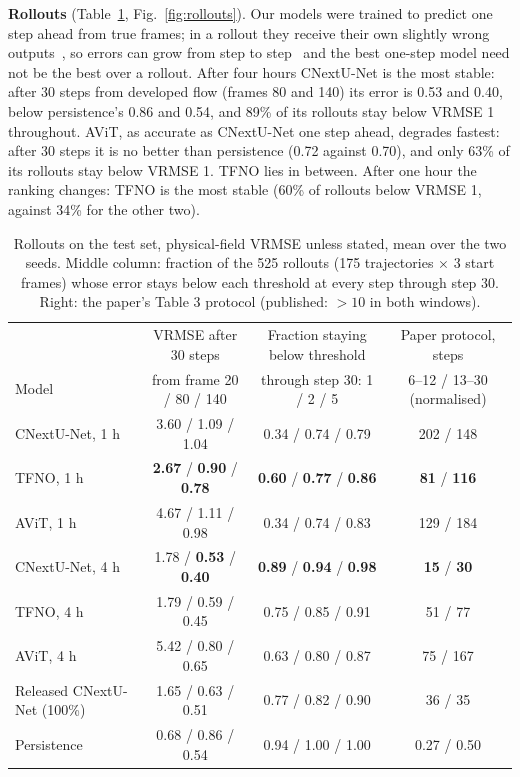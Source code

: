 \documentclass[11pt]{article}
\begin{document}
\newpage
\textbf{Rollouts} (Table~\ref{tab:rollout}, Fig.~\ref{fig:rollouts}). Our models were trained to predict one step
ahead from true frames; in a rollout they receive their own slightly wrong outputs~\cite{brandstetter2022mp}, so
errors can grow from step to step~\cite{mccabe2023stability} and the best one-step model need not be the best over a
rollout. After four hours CNextU-Net is the most stable: after 30 steps from developed flow (frames 80 and 140) its
error is 0.53 and 0.40, below persistence's 0.86 and 0.54, and 89\% of its rollouts stay below VRMSE 1 throughout.
AViT, as accurate as CNextU-Net one step ahead, degrades fastest: after 30 steps it is no better than persistence
(0.72 against 0.70), and only 63\% of its rollouts stay below VRMSE 1. TFNO lies in between. After one hour the
ranking changes: TFNO is the most stable (60\% of rollouts below VRMSE 1, against 34\% for the other two).


\begin{table}[!htbp]
\centering\footnotesize
\begin{tabular}{@{}lccc@{}}
\toprule
& VRMSE after 30 steps & Fraction staying below threshold & Paper protocol, steps \\
Model & from frame 20 / 80 / 140 & through step 30: 1 / 2 / 5 & 6--12 / 13--30 (normalised) \\
\midrule
CNextU-Net, 1 h & 3.60 / 1.09 / 1.04 & 0.34 / 0.74 / 0.79 & 202 / 148 \\
TFNO, 1 h & \textbf{2.67} / \textbf{0.90} / \textbf{0.78} & \textbf{0.60} / \textbf{0.77} / \textbf{0.86} & \textbf{81} / \textbf{116} \\
AViT, 1 h & 4.67 / 1.11 / 0.98 & 0.34 / 0.74 / 0.83 & 129 / 184 \\
\midrule
CNextU-Net, 4 h & 1.78 / \textbf{0.53} / \textbf{0.40} & \textbf{0.89} / \textbf{0.94} / \textbf{0.98} & \textbf{15} / \textbf{30} \\
TFNO, 4 h & 1.79 / 0.59 / 0.45 & 0.75 / 0.85 / 0.91 & 51 / 77 \\
AViT, 4 h & 5.42 / 0.80 / 0.65 & 0.63 / 0.80 / 0.87 & 75 / 167 \\
\midrule
Released CNextU-Net (100\%) & 1.65 / 0.63 / 0.51 & 0.77 / 0.82 / 0.90 & 36 / 35 \\
Persistence & 0.68 / 0.86 / 0.54 & 0.94 / 1.00 / 1.00 & 0.27 / 0.50 \\
\bottomrule
\end{tabular}
\caption{Rollouts on the test set, physical-field VRMSE unless stated, mean over the two seeds. Middle column:
fraction of the 525 rollouts (175 trajectories $\times$ 3 start frames) whose error stays below each threshold at
every step through step 30. Right: the paper's Table 3 protocol (published: $>10$ in both windows).}
\label{tab:rollout}
\end{table}
\end{document}
